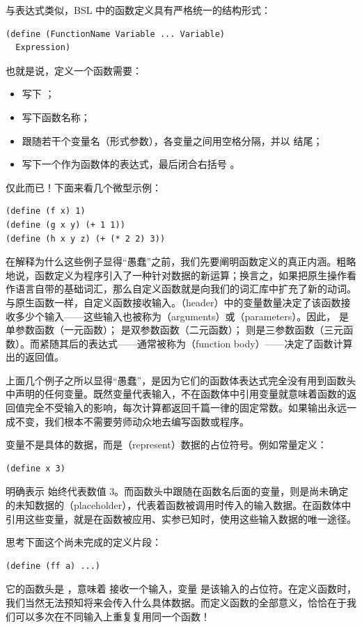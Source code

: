与表达式类似，BSL 中的函数定义具有严格统一的结构形式：
\begin{lstlisting}[language=BSL]
(define (FunctionName Variable ... Variable)
  Expression)
\end{lstlisting}

也就是说，定义一个函数需要：
\begin{itemize}
  \item 写下 ；
  \item 写下函数名称；
  \item 跟随若干个变量名（形式参数），各变量之间用空格分隔，并以 \code{)} 结尾；
  \item 写下一个作为函数体的表达式，最后闭合右括号 \code{)}。
\end{itemize}

仅此而已！下面来看几个微型示例：
\begin{lstlisting}[language=BSL]
(define (f x) 1)
(define (g x y) (+ 1 1))
(define (h x y z) (+ (* 2 2) 3))
\end{lstlisting}

在解释为什么这些例子显得“愚蠢”之前，我们先要阐明函数定义的真正内涵。粗略地说，函数定义为程序引入了一种针对数据的新运算；换言之，如果把原生操作看作语言自带的基础词汇，那么自定义函数就是向我们的词汇库中扩充了新的动词。与原生函数一样，自定义函数接收输入。（header）中的变量数量决定了该函数接收多少个输入——这些输入也被称为（arguments）或（parameters）。因此， 是单参数函数（一元函数）； 是双参数函数（二元函数）； 则是三参数函数（三元函数）。而紧随其后的表达式——通常被称为（function body）——决定了函数计算出的返回值。

上面几个例子之所以显得“愚蠢”，是因为它们的函数体表达式完全没有用到函数头中声明的任何变量。既然变量代表输入，不在函数体中引用变量就意味着函数的返回值完全不受输入的影响，每次计算都返回千篇一律的固定常数。如果输出永远一成不变，我们根本不需要劳师动众地去编写函数或程序。

变量不是具体的数据，而是（represent）数据的占位符号。例如常量定义：
\begin{lstlisting}[language=BSL]
(define x 3)
\end{lstlisting}
明确表示  始终代表数值 3。而函数头中跟随在函数名后面的变量，则是尚未确定的未知数据的（placeholder），代表着函数被调用时传入的输入数据。在函数体中引用这些变量，就是在函数被应用、实参已知时，使用这些输入数据的唯一途径。

思考下面这个尚未完成的定义片段：
\begin{lstlisting}[language=BSL]
(define (ff a) ...)
\end{lstlisting}
它的函数头是 ，意味着  接收一个输入，变量  是该输入的占位符。在定义函数时，我们当然无法预知将来会传入什么具体数据。而定义函数的全部意义，恰恰在于我们可以多次在不同输入上重复复用同一个函数！

